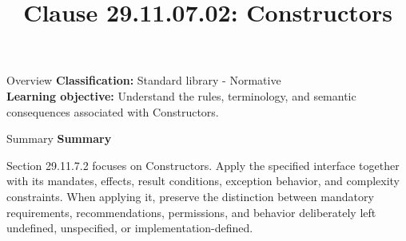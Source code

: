 \documentclass[10pt,letterpaper]{article}
\title{Clause 29.11.07.02: Constructors}
\author{}
\date{}
\begin{document}
\maketitle
\begin{CornellOverviewBox}{Overview}
\textbf{Classification:} Standard library - Normative\\[2pt]
\textbf{Learning objective:} Understand the rules, terminology, and semantic consequences associated with Constructors.
\end{CornellOverviewBox}\begin{CornellSummaryBox}{Summary}
{\sffamily\bfseries\color{Accent} Summary}\par\vspace{3pt}Section 29.11.7.2 focuses on Constructors. Apply the specified interface together with its mandates, effects, result conditions, exception behavior, and complexity constraints. When applying it, preserve the distinction between mandatory requirements, recommendations, permissions, and behavior deliberately left undefined, unspecified, or implementation-defined.
\end{CornellSummaryBox}
\end{document}
